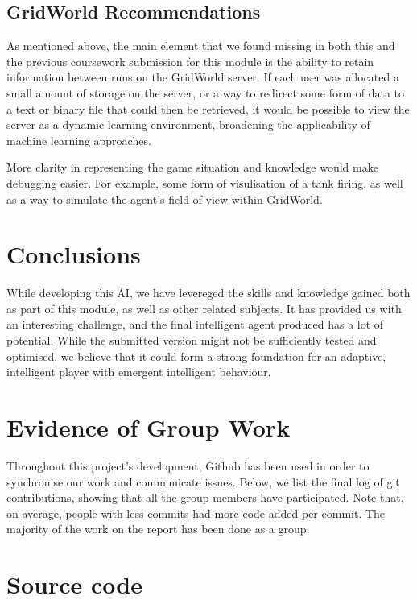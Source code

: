 \documentclass[11pt]{article}
\begin{document}
\subsection{GridWorld Recommendations}
As mentioned above, the main element that we found missing in both this and the previous coursework submission for this module is the ability to retain information between runs on the GridWorld server. If each user was allocated a small amount of storage on the server, or a way to redirect some form of data to a text or binary file that could then be retrieved, it would be possible to view the server as a dynamic learning environment, broadening the applicability of machine learning approaches.

More clarity in representing the game situation and knowledge would make debugging easier. For example, some form of visulisation of a tank firing, as well as a way to simulate the agent's field of view within GridWorld.

\section{Conclusions}
While developing this AI, we have levereged the skills and knowledge gained both as part of this module, as well as other related subjects. It has provided us with an interesting challenge, and the final intelligent agent produced has a lot of potential. While the submitted version might not be sufficiently tested and optimised, we believe that it could form a strong foundation for an adaptive, intelligent player with emergent intelligent behaviour.

\newpage
{}



\newpage
\appendix

\section{Evidence of Group Work}
Throughout this project's development, Github has been used in order to synchronise our work and communicate issues. Below, we list the final log of git contributions, showing that all the group members have participated. Note that, on average, people with less commits had more code added per commit. The majority of the work on the report has been done as a group.
\section{Source code}
\end{document}
